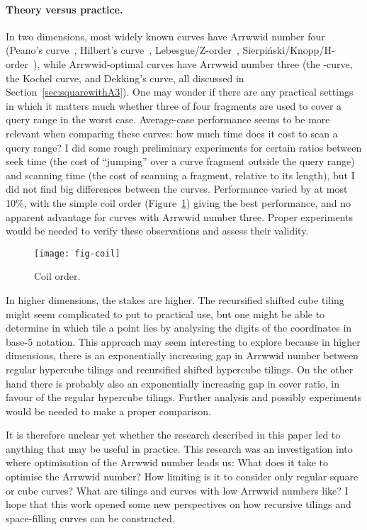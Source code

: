 \documentclass[11pt,a4paper]{article}
\newcommand{\ARRWW}{\xspace}
\begin{document}
\paragraph{Theory versus practice.}
In two dimensions, most widely known curves have Arrwwid number four (Peano's curve~\cite{Peano1890}, Hilbert's curve~\cite{Hilbert1891}, Lebesgue/Z-order~\cite{Lebesgue1904}, Sierpi\'nski/Knopp/H-order~\cite{Niedermeier2002,Sagan1994}), while Arrwwid-optimal curves have Arrwwid number three (the \ARRWW-curve, the Kochel curve, and Dekking's curve, all discussed in Section~\ref{sec:squarewithA3}). One may wonder if there are any practical settings in which it matters much whether three of four fragments are used to cover a query range in the worst case. Average-case performance seems to be more relevant when comparing these curves: how much time does it cost to scan a query range? I did some rough preliminary experiments for certain ratios between seek time (the cost of ``jumping'' over a curve fragment outside the query range) and scanning time (the cost of scanning a fragment, relative to its length), but I did not find big differences between the curves. Performance varied by at most 10\%, with the simple coil order (Figure~\ref{fig:coil}) giving the best performance, and no apparent advantage for curves with Arrwwid number three. Proper experiments would be needed to verify these observations and assess their validity.

\begin{figure}
\centering
\texttt{[image: fig-coil]}
\caption{Coil order.}
\label{fig:coil}
\end{figure}

In higher dimensions, the stakes are higher. The recursified shifted cube tiling might seem complicated to put to practical use, but one might be able to determine in which tile a point lies by analysing the digits of the coordinates in base-5 notation. This approach may seem interesting to explore because in higher dimensions, there is an exponentially increasing gap in Arrwwid number between regular hypercube tilings and recursified shifted hypercube tilings. On the other hand there is probably also an exponentially increasing gap in cover ratio, in favour of the regular hypercube tilings. Further analysis and possibly experiments would be needed to make a proper comparison.

It is therefore unclear yet whether the research described in this paper led to anything that may be useful in practice. This research was an investigation into where optimisation of the Arrwwid number leads us: What does it take to optimise the Arrwwid number? How limiting is it to consider only regular square or cube curves? What are tilings and curves with low Arrwwid numbers like? I hope that this work opened some new perspectives on how recursive tilings and space-filling curves can be constructed.
\end{document}
